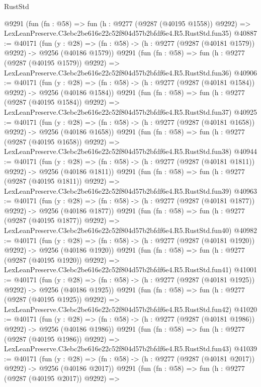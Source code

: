 \begin{lexlean}{RustStd}
\begin{coremodule}
    @9291
    (fun (fn : @58) =>
    fun (h : @9277 (@9287 (@40195 @1558)) @9292) =>
    LexLeanPreserve.C3ebc2be616e22c52f804d57b2bfdf6e4.R5.RustStd.fun35)
@40887 := @40171
    (fun (y : @28) =>
    (fn : @58) -> (h : @9277 (@9287 (@40181 @1579)) @9292) -> @9256 (@40186 @1579))
    @9291
    (fun (fn : @58) =>
    fun (h : @9277 (@9287 (@40195 @1579)) @9292) =>
    LexLeanPreserve.C3ebc2be616e22c52f804d57b2bfdf6e4.R5.RustStd.fun36)
@40906 := @40171
    (fun (y : @28) =>
    (fn : @58) -> (h : @9277 (@9287 (@40181 @1584)) @9292) -> @9256 (@40186 @1584))
    @9291
    (fun (fn : @58) =>
    fun (h : @9277 (@9287 (@40195 @1584)) @9292) =>
    LexLeanPreserve.C3ebc2be616e22c52f804d57b2bfdf6e4.R5.RustStd.fun37)
@40925 := @40171
    (fun (y : @28) =>
    (fn : @58) -> (h : @9277 (@9287 (@40181 @1658)) @9292) -> @9256 (@40186 @1658))
    @9291
    (fun (fn : @58) =>
    fun (h : @9277 (@9287 (@40195 @1658)) @9292) =>
    LexLeanPreserve.C3ebc2be616e22c52f804d57b2bfdf6e4.R5.RustStd.fun38)
@40944 := @40171
    (fun (y : @28) =>
    (fn : @58) -> (h : @9277 (@9287 (@40181 @1811)) @9292) -> @9256 (@40186 @1811))
    @9291
    (fun (fn : @58) =>
    fun (h : @9277 (@9287 (@40195 @1811)) @9292) =>
    LexLeanPreserve.C3ebc2be616e22c52f804d57b2bfdf6e4.R5.RustStd.fun39)
@40963 := @40171
    (fun (y : @28) =>
    (fn : @58) -> (h : @9277 (@9287 (@40181 @1877)) @9292) -> @9256 (@40186 @1877))
    @9291
    (fun (fn : @58) =>
    fun (h : @9277 (@9287 (@40195 @1877)) @9292) =>
    LexLeanPreserve.C3ebc2be616e22c52f804d57b2bfdf6e4.R5.RustStd.fun40)
@40982 := @40171
    (fun (y : @28) =>
    (fn : @58) -> (h : @9277 (@9287 (@40181 @1920)) @9292) -> @9256 (@40186 @1920))
    @9291
    (fun (fn : @58) =>
    fun (h : @9277 (@9287 (@40195 @1920)) @9292) =>
    LexLeanPreserve.C3ebc2be616e22c52f804d57b2bfdf6e4.R5.RustStd.fun41)
@41001 := @40171
    (fun (y : @28) =>
    (fn : @58) -> (h : @9277 (@9287 (@40181 @1925)) @9292) -> @9256 (@40186 @1925))
    @9291
    (fun (fn : @58) =>
    fun (h : @9277 (@9287 (@40195 @1925)) @9292) =>
    LexLeanPreserve.C3ebc2be616e22c52f804d57b2bfdf6e4.R5.RustStd.fun42)
@41020 := @40171
    (fun (y : @28) =>
    (fn : @58) -> (h : @9277 (@9287 (@40181 @1986)) @9292) -> @9256 (@40186 @1986))
    @9291
    (fun (fn : @58) =>
    fun (h : @9277 (@9287 (@40195 @1986)) @9292) =>
    LexLeanPreserve.C3ebc2be616e22c52f804d57b2bfdf6e4.R5.RustStd.fun43)
@41039 := @40171
    (fun (y : @28) =>
    (fn : @58) -> (h : @9277 (@9287 (@40181 @2017)) @9292) -> @9256 (@40186 @2017))
    @9291
    (fun (fn : @58) =>
    fun (h : @9277 (@9287 (@40195 @2017)) @9292) =>

\end{coremodule}
\end{lexlean}
